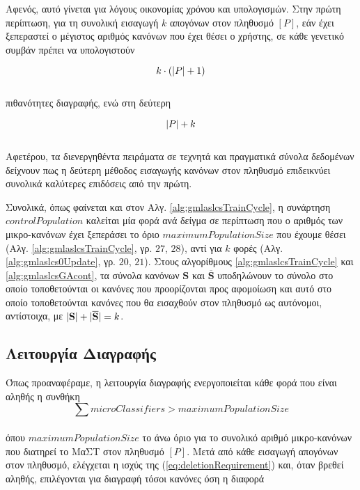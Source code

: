 Αφενός, αυτό γίνεται για λόγους οικονομίας χρόνου και υπολογισμών. Στην πρώτη περίπτωση, για τη συνολική εισαγωγή $k$ απογόνων στον πληθυσμό $[P]$, εάν έχει ξεπεραστεί ο μέγιστος αριθμός κανόνων που έχει θέσει ο χρήστης, σε κάθε γενετικό συμβάν πρέπει να υπολογιστούν 

\begin{equation}
k \cdot (\lvert P\rvert + 1)
\end{equation}
\\
πιθανότητες διαγραφής, ενώ στη δεύτερη 

\begin{equation}
\lvert P\rvert + k
\end{equation}
\\
Αφετέρου, τα διενεργηθέντα πειράματα σε τεχνητά και πραγματικά σύνολα δεδομένων δείχνουν πως η δεύτερη μέθοδος εισαγωγής κανόνων στον πληθυσμό επιδεικνύει συνολικά καλύτερες επιδόσεις από την πρώτη.

Συνολικά, όπως φαίνεται και στον Αλγ. \ref{alg:gmlaslcsTrainCycle}, η συνάρτηση  $controlPopulation$ καλείται μία φορά ανά δείγμα σε περίπτωση που ο αριθμός των μικρο-κανόνων έχει  ξεπεράσει το όριο $maximumPopulationSize$ που έχουμε θέσει (Αλγ. \ref{alg:gmlaslcsTrainCycle}, γρ. $27$, $28$), αντί για $k$ φορές (Αλγ. \ref{alg:gmlaslcs0Update}, γρ. $20$, $21$). Στους αλγορίθμους \ref{alg:gmlaslcsTrainCycle} και \ref{alg:gmlaslcsGAcont}, τα σύνολα κανόνων $\textbf{S}$ και $\overline{\textbf{S}}$ υποδηλώνουν το σύνολο στο οποίο τοποθετούνται οι κανόνες που προορίζονται προς αφομοίωση και αυτό στο οποίο τοποθετούνται κανόνες που θα εισαχθούν στον πληθυσμό ως αυτόνομοι, αντίστοιχα,
με $\lvert\textbf{S}\rvert+\lvert\overline{\textbf{S}}\rvert = k$.


\subsection{Λειτουργία Διαγραφής}
\label{subsec:gmlaslcsDeletion}
Όπως προαναφέραμε, η λειτουργία διαγραφής ενεργοποιείται κάθε φορά που είναι αληθής η συνθήκη
\begin{equation}
\label{eq:deletionRequirement}
\sum microClassifiers > maximumPopulationSize
\end{equation}
\\
όπου $maximumPopulationSize$ το άνω όριο για το συνολικό αριθμό μικρο-κανόνων που διατηρεί το ΜαΣΤ στον πληθυσμό $[P]$. Μετά από κάθε εισαγωγή απογόνων στον πληθυσμό, ελέγχεται η ισχύς της (\ref{eq:deletionRequirement}) και, όταν βρεθεί αληθής, επιλέγονται για διαγραφή τόσοι κανόνες όση η διαφορά

